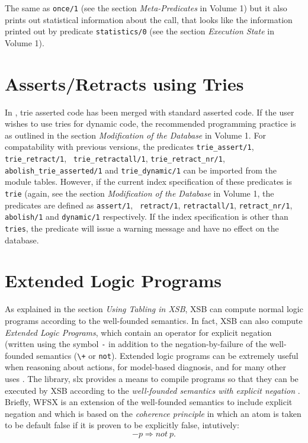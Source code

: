 \begin{description}
     The same as {\tt once/1} (see the section {\it Meta-Predicates}
in Volume 1)
     but it also prints out statistical information about the call,
     that looks like the information printed out by predicate
     {\tt statistics/0} (see the section {\it Execution State} in Volume 1).
\end{description}

%
\section{Asserts/Retracts using Tries }


In \version, trie asserted code has been merged with standard asserted
code.  If the user wishes to use tries for dynamic code, the
recommended programming practice is as outlined in the section {\it
Modification of the Database} in Volume 1.
For compatability with previous versions, the
predicates {\tt trie\_assert/1}, {\tt trie\_retract/1}, {\tt
trie\_retractall/1}, {\tt trie\_retract\_nr/1}, {\tt
abolish\_trie\_asserted/1} and {\tt trie\_dynamic/1} can be imported
from the module {\sf tables}.  However, if the current index
specification of these predicates is {\tt trie} (again, see the
section {\it Modification of the Database} in Volume 1, the predicates
are defined as {\tt assert/1}, {\tt 
retract/1}, {\tt retractall/1}, {\tt retract\_nr/1}, {\tt abolish/1}
and {\tt dynamic/1} respectively.  If the index specification is other
than {\tt tries}, the predicate will issue a warning message and have
no effect on the database.

\section{Extended Logic Programs}  \label{library_utilities:wfsx}
As explained in the section {\it Using Tabling in XSB}, XSB can
compute normal logic programs according to the well-founded semantics.
In fact, XSB 
can also compute {\em Extended Logic Programs}, which contain an
operator for explicit negation (written using the symbol {\tt -} in
addition to the negation-by-failure of the well-founded semantics
(\verb|\+| or {\tt not}).  Extended logic programs can be extremely
useful when reasoning about actions, for model-based diagnosis, and
for many other uses \cite{AlPe95}.  The library, {\sf slx} provides a means
to compile programs so that they can be executed by XSB according to
the {\em well-founded semantics with explicit negation} \cite{ADP95}.
Briefly, WFSX is an extension of the well-founded semantics to include
explicit negation and which is based on the {\em coherence principle}
in which an atom is taken to be default false if it is proven to be
explicitly false, intutively:
\[
-p \Rightarrow not\ p.
\]


